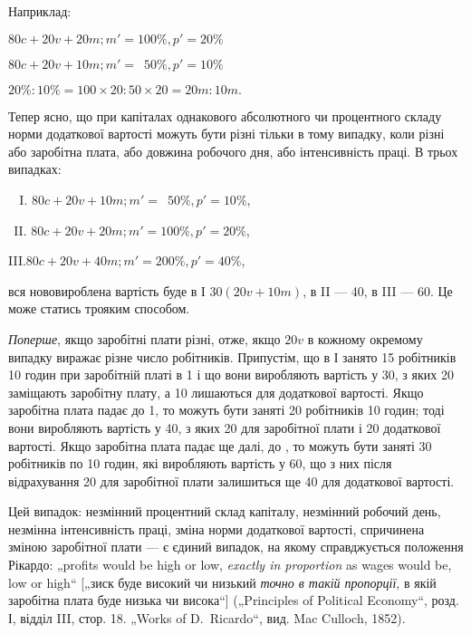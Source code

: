 
Наприклад:
\begin{center}
$80 c + 20 v + 20 m; m' = 100\%, p' = 20\%$

$80 c + 20 v + 10 m; m' = \phantom{0}50\%, p' = 10\%$

$20\%:10\% = 100×20:50×20 = 20 m:10 m.$
\end{center}

Тепер ясно, що при капіталах однакового абсолютного чи
процентного складу норми додаткової вартості можуть бути
різні тільки в тому випадку, коли різні або заробітна плата,
або довжина робочого дня, або інтенсивність праці. В трьох
випадках:
\begin{center}
$\phantom{II}$I. $80 c + 20 v + 10 m; m' = \phantom{0}50\%, p' = 10\%$,

$\phantom{I}$II. $80 c + 20 v + 20 m; m' = 100\%, p' = 20\%$,

III.$80 c + 20 v + 40 m; m' = 200\%, p' = 40\%$,
\end{center}
вся нововироблена вартість буде в І $30 (20 v + 10 m)$, в II — 40,
в III — 60. Це може статись трояким способом.

\emph{Поперше}, якщо заробітні плати різні, отже, якщо $20 v$ в кожному
окремому випадку виражає різне число робітників. Припустім,
що в І занято 15 робітників 10 годин при заробітній
платі в 1 і що вони виробляють вартість
у 30, з яких 20 заміщають
заробітну плату, а 10 лишаються для додаткової
вартості. Якщо заробітна плата падає до 1,
то можуть бути заняті 20 робітників 10 годин; тоді вони
виробляють вартість у 40, з яких 20 для заробітної плати і 20 додаткової
вартості. Якщо заробітна плата падає ще далі, до , то можуть бути заняті 30 робітників по 10 годин,
які виробляють вартість у 60, що з них після
відрахування 20 для заробітної плати залишиться
ще 40 для додаткової вартості.

Цей випадок: незмінний процентний склад капіталу, незмінний
робочий день, незмінна інтенсивність праці, зміна норми
додаткової вартості, спричинена зміною заробітної плати — є
єдиний випадок, на якому справджується положення Рікардо:
„profits would be high or low, \emph{exactly in proportion} as wages
would be, low or high“ [„зиск буде високий чи низький \emph{точно
в такій пропорції}, в якій заробітна плата буде низька чи висока“]
(„Principles of Political Economy“, розд. І, відділ III, стор. 18.
„Works of D.~Ricardo“, вид. Mac Culloch, 1852).

